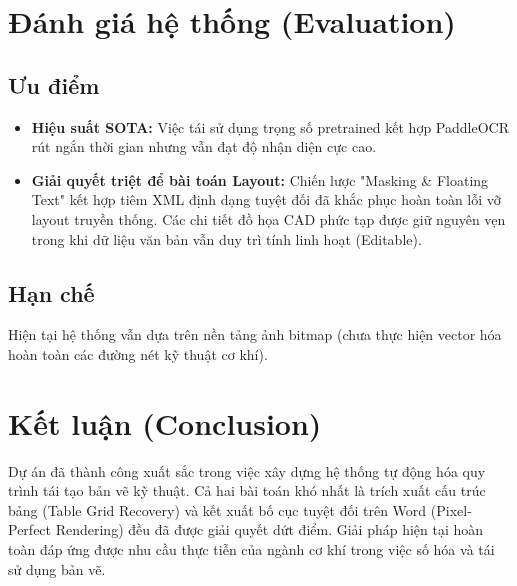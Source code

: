 \documentclass[12pt,a4paper]{article}
\begin{document}
\section{Đánh giá hệ thống (Evaluation)}

\subsection{Ưu điểm}
\begin{itemize}
    \item \textbf{Hiệu suất SOTA:} Việc tái sử dụng trọng số pretrained kết hợp PaddleOCR rút ngắn thời gian nhưng vẫn đạt độ nhận diện cực cao. 
    \item \textbf{Giải quyết triệt để bài toán Layout:} Chiến lược "Masking \& Floating Text" kết hợp tiêm XML định dạng tuyệt đối đã khắc phục hoàn toàn lỗi vỡ layout truyền thống. Các chi tiết đồ họa CAD phức tạp được giữ nguyên vẹn trong khi dữ liệu văn bản vẫn duy trì tính linh hoạt (Editable).
\end{itemize}

\subsection{Hạn chế}
Hiện tại hệ thống vẫn dựa trên nền tảng ảnh bitmap (chưa thực hiện vector hóa hoàn toàn các đường nét kỹ thuật cơ khí).

\section{Kết luận (Conclusion)}
Dự án đã thành công xuất sắc trong việc xây dựng hệ thống tự động hóa quy trình tái tạo bản vẽ kỹ thuật. Cả hai bài toán khó nhất là trích xuất cấu trúc bảng (Table Grid Recovery) và kết xuất bố cục tuyệt đối trên Word (Pixel-Perfect Rendering) đều đã được giải quyết dứt điểm. Giải pháp hiện tại hoàn toàn đáp ứng được nhu cầu thực tiễn của ngành cơ khí trong việc số hóa và tái sử dụng bản vẽ.
\end{document}
